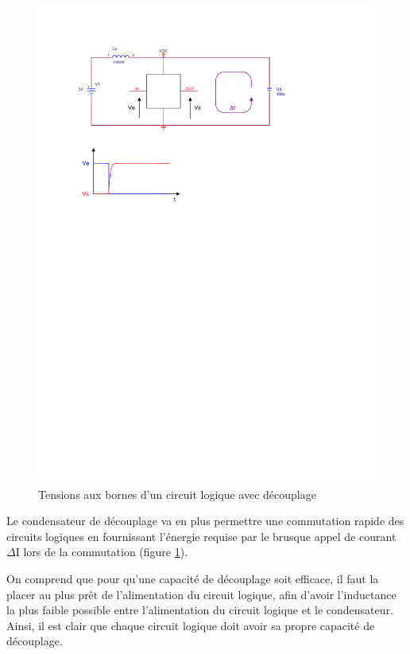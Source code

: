 \documentclass[a4paper]{article}
\begin{document}
\begin{figure}[H]
	\centering
	\includegraphics[scale=1.00]{Images/Tensions_circuit_avec_decouplage}
	\caption{Tensions aux bornes d'un circuit logique avec découplage
		\label{Tensions_circuit_avec_decouplage}}
\end{figure}

Le condensateur de découplage va en plus permettre une commutation rapide des circuits logiques en fournissant l'énergie requise par le brusque appel de courant $\Delta$I lors de la commutation (figure \ref{Tensions_circuit_avec_decouplage}).

On comprend que pour qu'une capacité de découplage soit efficace, il faut la placer au plus prêt de l'alimentation du circuit logique, afin d'avoir l'inductance la plus faible possible entre l'alimentation du circuit logique et le condensateur. Ainsi, il est clair que chaque circuit logique doit avoir sa propre capacité de découplage.
\end{document}

